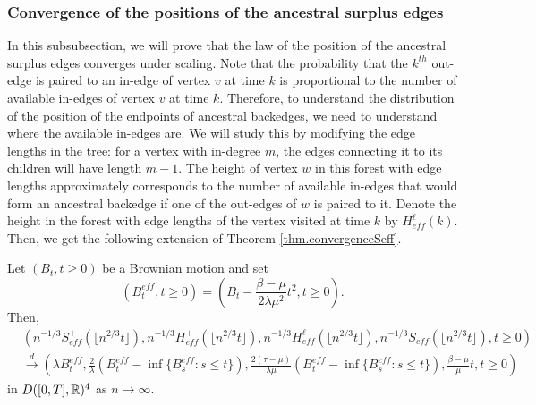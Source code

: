 \subsubsection{Convergence of the positions of the ancestral surplus edges}
In this subsubsection, we will prove that the law of the position of the ancestral surplus edges converges under scaling. Note that the probability that the $k^{th}$ out-edge is paired to an in-edge of vertex $v$ at time $k$ is proportional to the number of available in-edges of vertex $v$ at time $k$. Therefore, to understand the distribution of the position of the endpoints of ancestral backedges, we need to understand where the available in-edges are. We will study this by modifying the edge lengths in the tree: for a vertex with in-degree $m$, the edges connecting it to its children will have length $m-1$. The height of vertex $w$ in this forest with edge lengths approximately corresponds to the number of available in-edges that would form an ancestral backedge if one of the out-edges of $w$ is paired to it. Denote the height in the forest with edge lengths of the vertex visited at time $k$ by $H^\ell_{eff}(k)$. Then, we get the following extension of Theorem \ref{thm.convergenceSeff}.
\begin{lemma}\label{convergence.adaptedheightprocess}
Let $(B_t,t\geq 0)$ be a Brownian motion and set $$(B^{eff}_t,t\geq 0)=\left(B_t-\frac{\beta - \mu}{2\lambda \mu^2}t^2,t\geq 0\right).$$ Then,
\begin{align*}
    &\left(n^{-1/3}S^+_{eff}\left(\lfloor n^{2/3}t\rfloor\right),n^{-1/3}H^+_{eff}\left(\lfloor n^{2/3}t\rfloor\right),n^{-1/3}H^\ell_{eff}\left(\lfloor n^{2/3}t\rfloor\right), n^{-1/3}S^-_{eff}\left(\lfloor n^{2/3}t\rfloor\right), t\geq 0\right)\\
    &\overset{d}{\to}\left(\lambda B^{eff}_t,  \frac{2}{\lambda} \left(B^{eff}_{t}-\inf\{B^{eff}_{s}:s\leq t\}\right),\frac{2(\tau-\mu)}{\lambda\mu} \left(B^{eff}_{t}-\inf\{B^{eff}_{s}:s\leq t\}\right), \frac{\beta-\mu}{\mu} t, t\geq 0\right)
\end{align*}
in $D([0,T],{\mathbb R})^4$ as $n\to \infty$.
\end{lemma}
